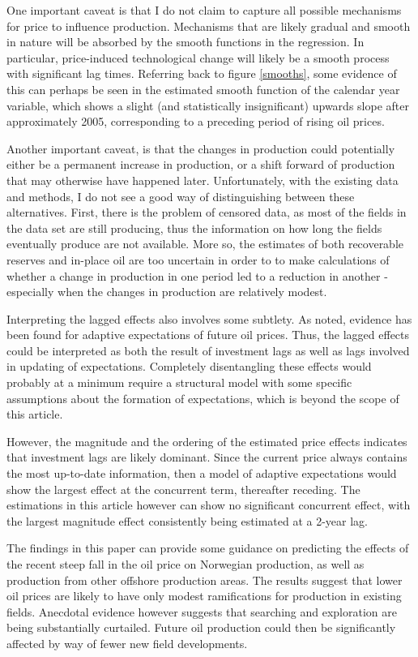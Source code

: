 \documentclass[11pt]{article}
\begin{document}
One important caveat is that I do not claim to capture all possible mechanisms for price to influence production.  Mechanisms that are likely gradual and smooth in nature will be absorbed by the smooth functions in the regression. In particular, price-induced technological change will likely be a smooth process with significant lag times. Referring back to figure \ref{smooths}, some evidence of this can perhaps be seen in the estimated smooth function of the calendar year variable, which shows a slight (and statistically insignificant) upwards slope after approximately 2005, corresponding to a preceding period of rising oil prices.   

Another important caveat, is that the changes in production could potentially either be a permanent increase in production, or a shift forward of production that may otherwise have happened later. Unfortunately, with the existing data and methods, I do not see a good way of distinguishing between these alternatives. First, there is the problem of censored data, as most of the fields in the data set are still producing, thus the information on how long the fields eventually produce are not available.  More so, the estimates of both recoverable reserves and in-place oil are too uncertain in order to to make calculations of whether a change in production in one period led to a reduction in another - especially when the changes in production are relatively modest.

Interpreting the lagged effects also involves some subtlety. As noted, evidence has been found for adaptive expectations of future oil prices.  Thus, the lagged effects could be interpreted as both the result of investment lags as well as lags involved in updating of expectations. Completely disentangling these effects would probably at a minimum require a structural model with some specific assumptions about the formation of expectations, which is beyond the scope of this article. 

However, the magnitude and the ordering of the estimated price effects indicates that investment lags are likely dominant. Since the current price always contains the most up-to-date information, then a model of adaptive expectations would show the largest effect at the concurrent term, thereafter receding. The estimations in this article however can show no significant concurrent effect, with the largest magnitude effect consistently being estimated at a 2-year lag.

The findings in this paper can provide some guidance on predicting the effects of the recent steep fall in the oil price on Norwegian production, as well as production from other offshore production areas. The results suggest that lower oil prices are likely to have only modest ramifications for production in existing fields.  Anecdotal evidence however suggests that searching and exploration are being substantially curtailed. Future oil production could then be significantly affected by way of fewer new field developments.
\end{document}
